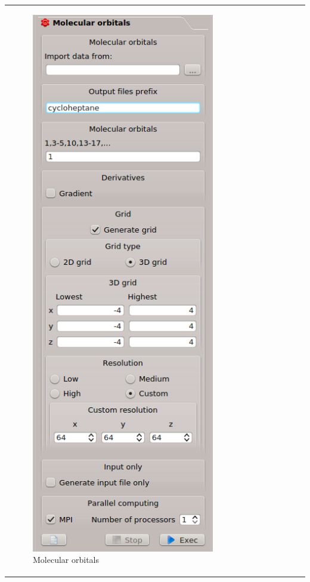 \documentclass[10pt]{article}
\begin{document}
\begin{tabular}{lcr}
\begin{minipage}{.53\linewidth}
\begin{figure}[H]
\begin{center}
\vspace*{-6.4mm}
\includegraphics[width=.45\linewidth]{damqt_fig_2_5_1.png}
\end{center}
\caption{{Molecular orbitals}\label{fig:2_5_1}}
\end{figure}
\end{minipage}
&
\begin{minipage}{.47\linewidth}
\begin{figure}[H]
\begin{center}
\vspace*{-8mm}

\end{center}
\end{figure}
\end{minipage}
\end{tabular}
\end{document}
